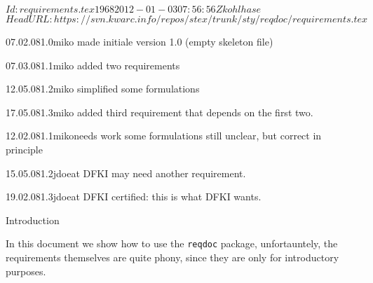 \documentclass[twoside]{omdoc}
\begin{document}
\svnInfo $Id: requirements.tex 1968 2012-01-03 07:56:56Z kohlhase $
\svnKeyword $HeadURL: https://svn.kwarc.info/repos/stex/trunk/sty/reqdoc/requirements.tex $
\begin{DCmetadata}[maketitle] 
  \DCMdate{\today}
\end{DCmetadata}

\begin{VMchangelist}
  \begin{VMchange}{07.02.08}{1.0}{miko}
    made initiale version 1.0 (empty skeleton file)
  \end{VMchange}
  \begin{VMchange}{07.03.08}{1.1}{miko}
    added two requirements
  \end{VMchange}
  \begin{VMchange}{12.05.08}{1.2}{miko}
    simplified some formulations
  \end{VMchange}
  \begin{VMchange}{17.05.08}{1.3}{miko}
    added third requirement that depends on the first two.
  \end{VMchange}
\end{VMchangelist}

\begin{VMcertification}
  \begin{VMcertified}{12.02.08}{1.1}{miko}{needs work}
    some formulations still unclear, but correct in principle
  \end{VMcertified}
  \begin{VMcertified}{15.05.08}{1.2}{jdoe}{at DFKI}
    may need another requirement.
  \end{VMcertified}
  \begin{VMcertified}{19.02.08}{1.3}{jdoe}{at DFKI}
    certified: this is what DFKI wants. 
  \end{VMcertified}
\end{VMcertification}
\clearpage

\begin{omgroup}{Introduction} 
\begin{omtext}
In this document we show how to use the {\texttt{reqdoc}} package, unfortauntely, the
requirements themselves are quite phony, since they are only for introductory purposes.
\end{omtext}
\end{omgroup}
\end{document}
